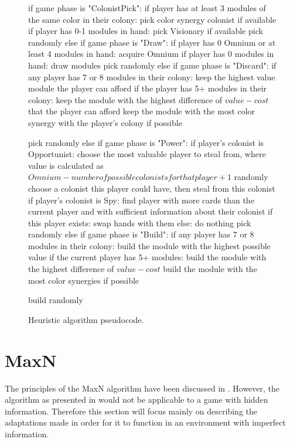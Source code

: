 \begin{figure}[ht]
\begin{code}[commandchars=\\\{\},codes={\catcode`\$=3\catcode`\^=7\catcode`\_=8}]
if game phase is "ColonistPick":
    if player has at least 3 modules of the same color in their colony:
        pick color synergy colonist if available
    if player has 0-1 modules in hand:
        pick Visionary if available
    pick randomly
else if game phase is "Draw":
    if player has 0 Omnium or at least 4 modules in hand:
        acquire Omnium
    if player has 0 modules in hand:
        draw modules
    pick randomly
else if game phase is "Discard":
    if any player has 7 or 8 modules in their colony:
        keep the highest value module the player can afford
    if the player has 5+ modules in their colony:
        keep the module with the highest difference of $value - cost$
        that the player can afford
    keep the module with the most color synergy with the player's
    colony if possible

    pick randomly
else if game phase is "Power":
    if player's colonist is Opportunist:
        choose the most valuable player to steal from,
        where value is calculated as
        $Omnium - number of possible colonists for that player + 1$
        randomly choose a colonist this player could have,
        then steal from this colonist
    if player's colonist is Spy:
        find player with more cards than the current player
        and with sufficient information about their colonist
        if this player exists:
            swap hands with them
        else:
            do nothing
    pick randomly
else if game phase is "Build":
    if any player has 7 or 8 modules in their colony:
        build the module with the highest possible value
    if the current player has 5+ modules:
        build the module with the highest difference of $value - cost$
    build the module with the most color synergies if possible

    build randomly
\end{code}
\caption{Heuristic algorithm pseudocode.}\label{algo:heur}
\end{figure}

\clearpage
\section{MaxN}
\label{sec:algomaxn}

The principles of the MaxN algorithm have been discussed in . 
However, the algorithm as presented in  would not be applicable
to a game with hidden information. Therefore
this section will focus mainly on describing the adaptations made in order for it
to function in an environment with imperfect information.

